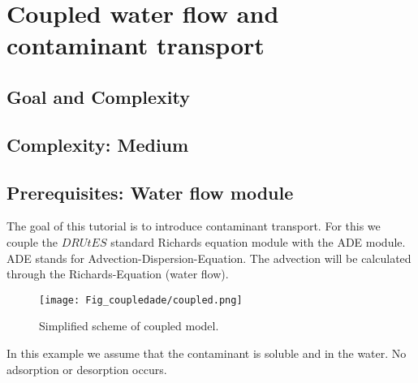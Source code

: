\section{Coupled water flow and contaminant transport}
\subsection{Goal and Complexity}
\subsection*{Complexity: Medium}

\subsection*{Prerequisites: Water flow module}

The goal of this tutorial is to introduce contaminant transport. For this we couple the $DRUtES$ standard Richards equation module with the ADE module. ADE stands for Advection-Dispersion-Equation. The advection will be calculated through the Richards-Equation (water flow).

\begin{figure}[!h]
\centering
\texttt{[image: Fig\_coupledade/coupled.png]}
\caption{Simplified scheme of coupled model.}
\end{figure}

In this example we assume that the contaminant is soluble and in the water. No adsorption or desorption occurs. 

